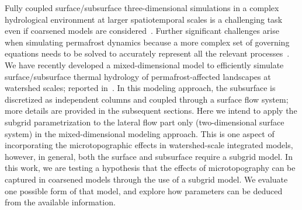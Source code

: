 \documentclass[review,11pt]{elsarticle}
\begin{document}
Fully coupled surface/subsurface three-dimensional simulations in a complex hydrological environment at larger spatiotemporal scales is a challenging task even if coarsened models are considered~\cite{frei2010effects}. Further significant challenges arise when simulating permafrost dynamics because a more complex set of governing equations needs to be solved to accurately represent all the relevant processes~\cite{painter2013modeling,jan2017}. We have recently developed a mixed-dimensional model to efficiently simulate surface/subsurface thermal hydrology of permafrost-affected landscapes at watershed scales; reported in~\cite{jan2017}. In this modeling approach, the subsurface is discretized as independent columns and coupled through a surface flow system; more details are provided in the subsequent sections. Here we intend to apply the subgrid parametrization to the lateral flow part only (two-dimensional surface system) in the mixed-dimensional modeling approach. This is one aspect of incorporating the microtopographic effects in watershed-scale integrated models, however, in general, both the surface and subsurface require a subgrid model. 
In this work, we are testing a hypothesis that the effects of microtopography can be captured in coarsened models through the use of a subgrid model. We evaluate one possible form of that model, and explore how parameters can be deduced from the available information.
\end{document}
